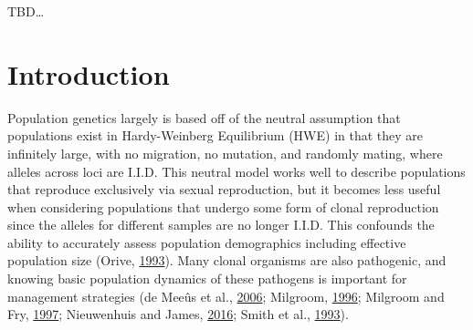 \documentclass[double,12pt]{beavtex}
\begin{document}
  TBD\ldots{}
  
  \section{Introduction}\label{introduction-4}
  
  Population genetics largely is based off of the neutral assumption that
  populations exist in Hardy-Weinberg Equilibrium (HWE) in that they are
  infinitely large, with no migration, no mutation, and randomly mating,
  where alleles across loci are I.I.D. This neutral model works well to
  describe populations that reproduce exclusively via sexual reproduction,
  but it becomes less useful when considering populations that undergo
  some form of clonal reproduction since the alleles for different samples
  are no longer I.I.D. This confounds the ability to accurately assess
  population demographics including effective population size (Orive,
  \protect\hyperlink{ref-orive1993effective}{1993}). Many clonal organisms
  are also pathogenic, and knowing basic population dynamics of these
  pathogens is important for management strategies (de Meeûs et al.,
  \protect\hyperlink{ref-de2006molecular}{2006}; Milgroom,
  \protect\hyperlink{ref-milgroom1996recombination}{1996}; Milgroom and
  Fry, \protect\hyperlink{ref-milgroom1997contributions}{1997};
  Nieuwenhuis and James,
  \protect\hyperlink{ref-nieuwenhuis2016frequency}{2016}; Smith et al.,
  \protect\hyperlink{ref-smith1993how}{1993}).
  
\end{document}
